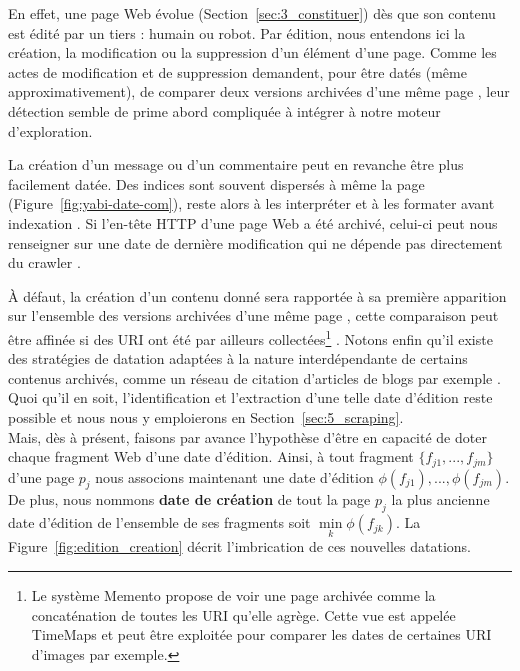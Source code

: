 \documentclass[symmetric,justified,marginals=raggedouter]{tufte-book}
\begin{document}
En effet, une page Web évolue (Section~\ref{sec:3_constituer}) dès que son contenu est édité par un tiers : humain ou robot. Par édition, nous entendons ici la création, la modification ou la suppression d'un élément d'une page. Comme les actes de modification et de suppression demandent, pour être datés (même approximativement), de comparer deux versions archivées d'une même page \citep{rocco_page_2003, nunes_using_2007}, leur détection semble de prime abord compliquée à intégrer à notre moteur d'exploration. 

La création d'un message ou d'un commentaire peut en revanche être plus facilement datée. Des indices sont souvent dispersés à même la page (Figure~\ref{fig:yabi-date-com}), reste alors à les interpréter et à les formater avant indexation \citep{de_jong_temporal_2005,kanhabua_using_2009}. Si l'en-tête HTTP d'une page Web a été archivé, celui-ci peut nous renseigner sur une date de dernière modification qui ne dépende pas directement du crawler  \citep{amitay_trend_2004}. 

À défaut, la création d'un contenu donné sera rapportée à sa première apparition sur l'ensemble des versions archivées d'une même page \citep{jatowt_detecting_2007}, cette comparaison peut être affinée si des URI ont été par ailleurs collectées\footnote{\RaggedOuter Le système Memento propose de voir une page archivée comme la concaténation de toutes les URI qu'elle agrège. Cette vue est appelée TimeMaps  \citep{van_de_sompel_http_2013} et peut être exploitée pour comparer les dates de certaines URI d'images par exemple.} \citep{aturban_difficulties_2017}. Notons enfin qu'il existe des stratégies de datation adaptées à la nature interdépendante de certains contenus archivés, comme un réseau de citation d'articles de blogs par exemple \citep{toyoda_whats_2006,spitz_predicting_2018}. Quoi qu'il en soit, l'identification et l'extraction d'une telle date d'édition reste possible et nous nous y emploierons en Section~\ref{sec:5_scraping}. \\

\noindent Mais, dès à présent, faisons par avance l'hypothèse d'être en capacité de doter chaque fragment Web d'une date d'édition. Ainsi, à tout fragment $\{f_{j1},...,f_{jm}\}$ d'une page $p_j$ nous associons maintenant une date d'édition $\phi(f_{j1}),...,\phi(f_{jm})$. De plus, nous nommons \textbf{date de création} de tout la page $p_j$ la plus ancienne date d'édition de l'ensemble de ses fragments soit $\min\limits_{k} \phi(f_{jk})$. La Figure~\ref{fig:edition_creation} décrit l'imbrication de ces nouvelles datations. 
\end{document}
